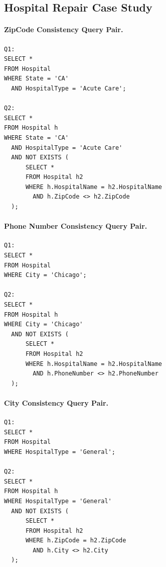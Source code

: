 \subsection{Hospital Repair Case Study}

\paragraph{ZipCode Consistency Query Pair.}

\begin{verbatim}
Q1:
SELECT *
FROM Hospital
WHERE State = 'CA'
  AND HospitalType = 'Acute Care';

Q2:
SELECT *
FROM Hospital h
WHERE State = 'CA'
  AND HospitalType = 'Acute Care'
  AND NOT EXISTS (
      SELECT *
      FROM Hospital h2
      WHERE h.HospitalName = h2.HospitalName
        AND h.ZipCode <> h2.ZipCode
  );
\end{verbatim}

\paragraph{Phone Number Consistency Query Pair.}

\begin{verbatim}
Q1:
SELECT *
FROM Hospital
WHERE City = 'Chicago';

Q2:
SELECT *
FROM Hospital h
WHERE City = 'Chicago'
  AND NOT EXISTS (
      SELECT *
      FROM Hospital h2
      WHERE h.HospitalName = h2.HospitalName
        AND h.PhoneNumber <> h2.PhoneNumber
  );
\end{verbatim}

\paragraph{City Consistency Query Pair.}

\begin{verbatim}
Q1:
SELECT *
FROM Hospital
WHERE HospitalType = 'General';

Q2:
SELECT *
FROM Hospital h
WHERE HospitalType = 'General'
  AND NOT EXISTS (
      SELECT *
      FROM Hospital h2
      WHERE h.ZipCode = h2.ZipCode
        AND h.City <> h2.City
  );
\end{verbatim}
